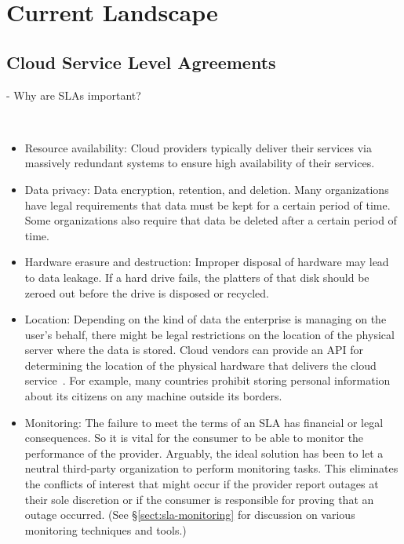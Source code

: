\section{Current Landscape} \label{sect:current-practice}

\subsection{Cloud Service Level Agreements} \label{sect:sla-overview}

- Why are SLAs important?

~\cite{Ahr+10,FMM+13,Kyr13}

\begin{itemize}
 \item Resource availability: Cloud providers typically deliver their services via massively redundant systems to ensure high availability of their services.
 
 \item Data privacy: Data encryption, retention, and deletion. Many organizations have legal requirements that data must be kept for a certain period of time. Some organizations also require that data be deleted after a certain period of time.
 
 \item Hardware erasure and destruction: Improper disposal of hardware may lead to data leakage. If a hard drive fails, the platters of that disk should be zeroed out before the drive is disposed or recycled.

 \item Location: Depending on the kind of data the enterprise is managing on the user's behalf, there might be legal restrictions on the location of the physical server where the data is stored. Cloud vendors can provide an API for determining the location of the physical hardware that delivers the cloud service~\cite{Ahr+10}. For example, many countries prohibit storing personal information about its citizens on any machine outside its borders.
 
 \item Monitoring: The failure to meet the terms of an SLA has financial or legal consequences. So it is vital for the consumer to be able to monitor the performance of the provider. Arguably, the ideal solution has been to let a neutral third-party organization to perform monitoring tasks. This eliminates the conflicts of interest that might occur if the provider report outages at their sole discretion or if the consumer is responsible for proving that an outage occurred. (See \S\ref{sect:sla-monitoring} for discussion on various monitoring techniques and tools.)
 

\end{itemize}
